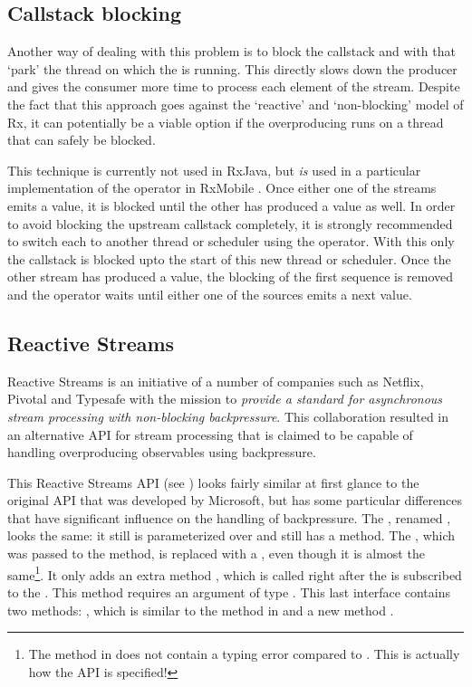\subsection{Callstack blocking}
\label{subsec:callstack-blocking}
Another way of dealing with this problem is to block the callstack and with that `park' the thread on which the \obs is running. This directly slows down the producer and gives the consumer more time to process each element of the stream. Despite the fact that this approach goes against the `reactive' and `non-blocking' model of Rx, it can potentially be a viable option if the overproducing \obs runs on a thread that can safely be blocked.

This technique is currently not used in RxJava\cite{RxJava-Wiki-Callstack-Blocking}, but \emph{is} used in a particular implementation of the  operator in RxMobile \cite{RxMobile}. Once either one of the streams emits a value, it is blocked until the other \obs has produced a value as well. In order to avoid blocking the upstream callstack completely, it is strongly recommended to switch each \obs to another thread or scheduler using the  operator. With this only the callstack is blocked upto the start of this new thread or scheduler. Once the other stream has produced a value, the blocking of the first \obs sequence is removed and the  operator waits until either one of the sources emits a next value.

\subsection{Reactive Streams}
\label{subsec:reactive-streams}
Reactive Streams is an initiative \cite{Reactive-Streams} of a number of companies such as Netflix, Pivotal and Typesafe with the mission to \textit{provide a standard for asynchronous stream processing with non-blocking backpressure}. This collaboration resulted in an alternative API \cite{Reactive-Streams-API} for stream processing that is claimed to be capable of handling overproducing observables using backpressure.

This Reactive Streams API (see ) looks fairly similar at first glance to the original API that was developed by Microsoft, but has some particular differences that have significant influence on the handling of backpressure. The \obs, renamed , looks the same: it still is parameterized over  and still has a  method. The \obv, which was passed to the  method, is replaced with a , even though it is almost the same\footnote{The  method in  does not contain a typing error compared to . This is actually how the API is specified!}. It only adds an extra method , which is called right after the  is subscribed to the . This  method requires an argument of type . This last interface contains two methods: , which is similar to the  method in  and a new method .

